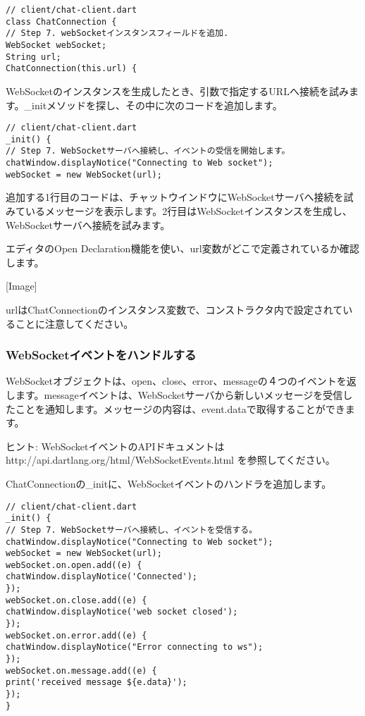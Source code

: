 \begin{verbatim}
// client/chat-client.dart
class ChatConnection {
// Step 7. webSocketインスタンスフィールドを追加.
WebSocket webSocket;
String url;
ChatConnection(this.url) {
\end{verbatim}

WebSocketのインスタンスを生成したとき、引数で指定するURLへ接続を試みます。\_initメソッドを探し、その中に次のコードを追加します。

\begin{verbatim}
// client/chat-client.dart
_init() {
// Step 7. WebSocketサーバへ接続し、イベントの受信を開始します。
chatWindow.displayNotice("Connecting to Web socket");
webSocket = new WebSocket(url);
\end{verbatim}

追加する1行目のコードは、チャットウインドウにWebSocketサーバへ接続を試みているメッセージを表示します。2行目はWebSocketインスタンスを生成し、WebSocketサーバへ接続を試みます。

エディタのOpen Declaration機能を使い、url変数がどこで定義されているか確認します。

[Image]

urlはChatConnectionのインスタンス変数で、コンストラクタ内で設定されていることに注意してください。

\subsubsection{WebSocketイベントをハンドルする}

WebSocketオブジェクトは、open、close、error、messageの４つのイベントを返します。messageイベントは、WebSocketサーバから新しいメッセージを受信したことを通知します。メッセージの内容は、event.dataで取得することができます。

ヒント: WebSocketイベントのAPIドキュメントは http://api.dartlang.org/html/WebSocketEvents.html を参照してください。

ChatConnectionの\_initに、WebSocketイベントのハンドラを追加します。

\begin{verbatim}
// client/chat-client.dart
_init() {
// Step 7. WebSocketサーバへ接続し、イベントを受信する。
chatWindow.displayNotice("Connecting to Web socket");
webSocket = new WebSocket(url);
webSocket.on.open.add((e) {
chatWindow.displayNotice('Connected');
});
webSocket.on.close.add((e) {
chatWindow.displayNotice('web socket closed');
});
webSocket.on.error.add((e) {
chatWindow.displayNotice("Error connecting to ws");
});
webSocket.on.message.add((e) {
print('received message ${e.data}');
});
}
\end{verbatim}

